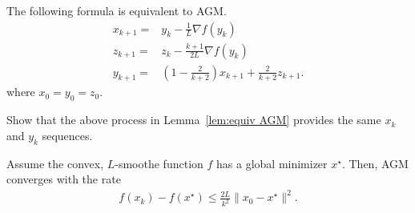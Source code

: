 \documentclass{article}
\begin{document}
\begin{lemma}\label{lem:equiv AGM}
    The following formula is equivalent to AGM.
\begin{align}
    x_{k+1} =& y_k - \frac{1}{L}\nabla f(y_k)\\
    z_{k+1} =& z_k - \frac{k+1}{2L}\nabla f(y_k)\\
    y_{k+1} =& \left(1-\frac{2}{k+2}\right) x_{k+1}+\frac{2}{k+2} z_{k+1}.
\end{align}
where $x_0=y_0 = z_0$.
\end{lemma}
\begin{exercise}
    Show that the above process in Lemma~\ref{lem:equiv AGM} provides the same $x_k$ and $y_k$ sequences.
\end{exercise}

\begin{theorem}
    Assume the convex, $L$-smoothe function $f$ has a global minimizer $x^\star$.
    Then, AGM converges with the rate
    \begin{align}
        f(x_k) - f(x^\star) \leq\frac {2L}{k^2} \|x_0-x^\star\|^2.
    \end{align}
\end{theorem}
\end{document}

